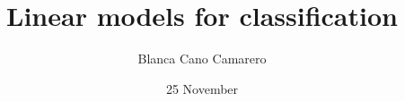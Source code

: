 
\title{Linear models for classification} %


\author[Blanca Cano Camarero]{Blanca Cano Camarero} %


\date{25 November} %

